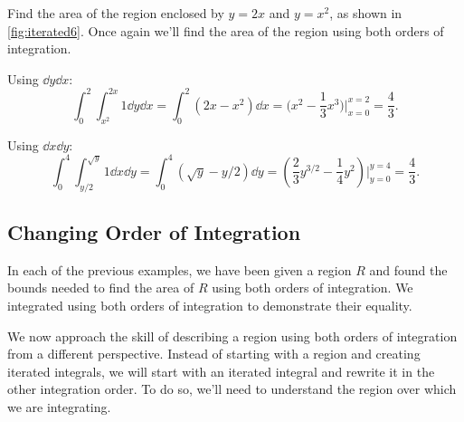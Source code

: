 \begin{example}\label{ex_iterated6}%
Find the area of the region enclosed by $y=2x$ and $y=x^2$, as shown in \autoref{fig:iterated6}.
%
\solution
Once again we'll find the area of the region using both orders of integration. 

Using $\dd y\dd x$:
\[
\int_0^2\int_{x^2}^{2x}1\dd y \dd x = \int_0^2(2x-x^2)\dd x
= \bigl(x^2-\frac13x^3\bigr)\Big|_{x=0}^{x=2} = \frac43.
\]

Using $\dd x\dd y$:
\[
\int_0^4\int_{y/2}^{\sqrt{y}} 1\dd x\dd y = \int_0^4 (\sqrt{y}-y/2)\dd y
= \left(\frac23y^{3/2} - \frac14y^2\right)\Big|_{y=0}^{y=4} = \frac43.
\]
\end{example}

\subsection{Changing Order of Integration}

In each of the previous examples, we have been given a region $R$ and found the bounds needed to find the area of $R$ using both orders of integration. We integrated using both orders of integration to demonstrate their equality.

We now approach the skill of describing a region using both orders of integration from a different perspective. Instead of starting with a region and creating iterated integrals, we will start with an iterated integral and rewrite it in the other integration order. To do so, we'll need to understand the region over which we are integrating.

